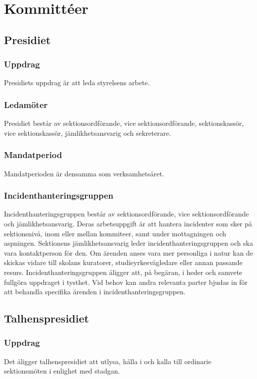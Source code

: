 \section{Kommittéer}

\subsection{Presidiet}
\subsubsection{Uppdrag}
Presidiets uppdrag är att leda styrelsens arbete.
\subsubsection{Ledamöter}
Presidiet består av sektionsordförande, vice sektionsordförande, sektionskassör, vice sektionskassör, jämlikhetsansvarig och sekreterare.
\subsubsection{Mandatperiod}
Mandatperioden är densamma som verksamhetsåret.
\subsubsection{Incidenthanteringsgruppen}
Incidenthanteringsgruppen består av sektionsordförande, vice
sektionsordförande och jämlikhetsansvarig. Deras arbetsuppgift är att hantera
incidenter som sker på sektionsnivå, inom eller mellan kommiteer, samt
under mottagningen och aspningen. Sektionens jämlikhetsansvarig leder
incidenthanteringsgruppen och ska vara kontaktperson för den. Om ärenden
anses vara mer personliga i natur kan de skickas vidare till skolans kuratorer,
studieyrkesvägledare eller annan passande resurs. Incidenthanteringsgruppen
åligger att, på begäran, i heder och samvete fullgöra uppdraget i tysthet. Vid
behov kan andra relevanta parter bjudas in för att behandla specifika ärenden
i incidenthanteringsgruppen.

\subsection{Talhenspresidiet}
\subsubsection{Uppdrag}
Det åligger talhenspresidiet att utlysa, hålla i och kalla till ordinarie sektionsmöten i enlighet med stadgan.
